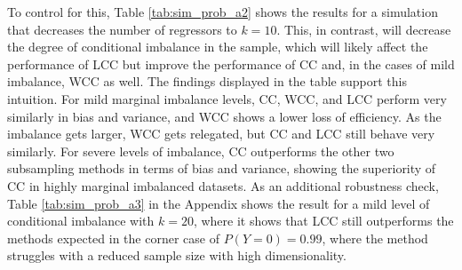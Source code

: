 To control for this, Table \ref{tab:sim_prob_a2} shows the results for a simulation that decreases the number of regressors to $k=10$. This, in contrast, will decrease the degree of conditional imbalance in the sample, which will likely affect the performance of LCC but improve the performance of CC and, in the cases of mild imbalance, WCC as well. The findings displayed in the table support this intuition. For mild marginal imbalance levels, CC, WCC, and LCC perform very similarly in bias and variance, and WCC shows a lower loss of efficiency. As the imbalance gets larger, WCC gets relegated, but CC and LCC still behave very similarly. For severe levels of imbalance, CC outperforms the other two subsampling methods in terms of bias and variance, showing the superiority of CC in highly marginal imbalanced datasets. As an additional robustness check, Table \ref{tab:sim_prob_a3} in the Appendix shows the result for a mild level of conditional imbalance with $k=20$, where it shows that LCC still outperforms the methods expected in the corner case of $P(Y=0)=0.99$, where the method struggles with a reduced sample size with high dimensionality. 



    
